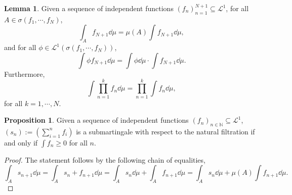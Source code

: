 \documentclass[]{article}
\theoremstyle{definition}
\theoremstyle{definition}
\newtheorem{lemma}{Lemma}[section]
\newtheorem{proposition}{Proposition}[section]
\begin{document}
\begin{lemma}
  Given a sequence of independent functions \((f_n)_{n = 1}^{N + 1} 
  \subseteq \mathcal{L}^1\), for all \(A \in \sigma(f_1, \cdots, f_N)\),
  \[\int_A f_{N+ 1} \dd \mu = \mu(A) \int f_{N + 1} \dd \mu,\]
  and for all \(\phi \in \mathcal{L}^1(\sigma(f_1, \cdots, f_N))\),  
  \[\int \phi f_{N + 1} \dd\mu = \int \phi \dd\mu \cdot\int f_{N + 1}\dd\mu.\]
  Furthermore, 
  \[\int \prod_{n = 1}^k f_n \dd \mu = \prod_{n = 1}^k \int f_n \dd \mu,\]
  for all \(k = 1, \cdots, N\).
\end{lemma}

\begin{proposition}
  Given a sequence of independent functions \((f_n)_{n \in \mathbb{N}} 
  \subseteq \mathcal{L}^1\), \((s_n) := \left(\sum_{i = 1}^n f_i\right)\) is 
  a submartingale with respect to the natural filtration if and only if 
  \(\int f_n \ge 0\) for all \(n\).
\end{proposition}
\begin{proof}
  The statement follows by the following chain of equalities,
  \[\int_A s_{n + 1} \dd \mu = \int_A s_n + f_{n + 1} \dd \mu = 
    \int_A s_n \dd \mu + \int_A f_{n + 1} \dd \mu = 
    \int_A s_n \dd \mu + \mu(A) \int f_{n + 1} \dd \mu.\] 
\end{proof}
\end{document}
